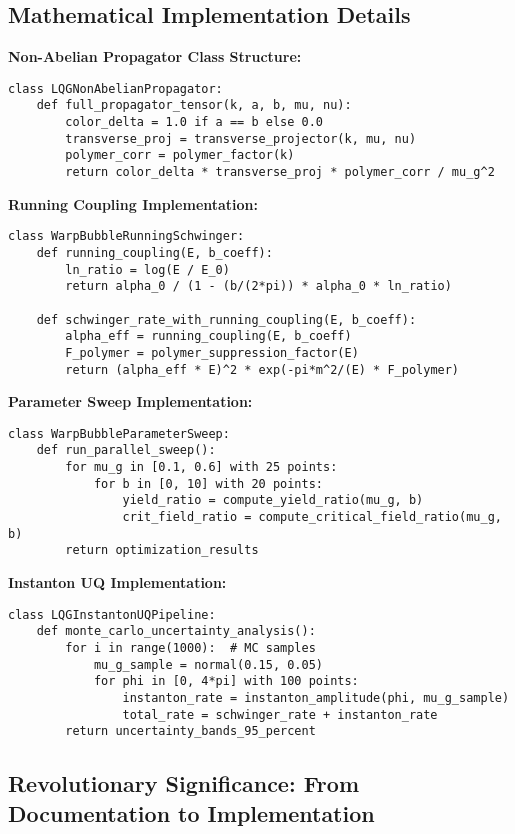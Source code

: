 \documentclass[11pt]{article}
\begin{document}
\subsection{Mathematical Implementation Details}

\textbf{Non-Abelian Propagator Class Structure:}
\begin{verbatim}
class LQGNonAbelianPropagator:
    def full_propagator_tensor(k, a, b, mu, nu):
        color_delta = 1.0 if a == b else 0.0
        transverse_proj = transverse_projector(k, mu, nu)
        polymer_corr = polymer_factor(k)
        return color_delta * transverse_proj * polymer_corr / mu_g^2
\end{verbatim}

\textbf{Running Coupling Implementation:}
\begin{verbatim}
class WarpBubbleRunningSchwinger:
    def running_coupling(E, b_coeff):
        ln_ratio = log(E / E_0)
        return alpha_0 / (1 - (b/(2*pi)) * alpha_0 * ln_ratio)
    
    def schwinger_rate_with_running_coupling(E, b_coeff):
        alpha_eff = running_coupling(E, b_coeff)
        F_polymer = polymer_suppression_factor(E)
        return (alpha_eff * E)^2 * exp(-pi*m^2/(E) * F_polymer)
\end{verbatim}

\textbf{Parameter Sweep Implementation:}
\begin{verbatim}
class WarpBubbleParameterSweep:
    def run_parallel_sweep():
        for mu_g in [0.1, 0.6] with 25 points:
            for b in [0, 10] with 20 points:
                yield_ratio = compute_yield_ratio(mu_g, b)
                crit_field_ratio = compute_critical_field_ratio(mu_g, b)
        return optimization_results
\end{verbatim}

\textbf{Instanton UQ Implementation:}
\begin{verbatim}
class LQGInstantonUQPipeline:
    def monte_carlo_uncertainty_analysis():
        for i in range(1000):  # MC samples
            mu_g_sample = normal(0.15, 0.05)
            for phi in [0, 4*pi] with 100 points:
                instanton_rate = instanton_amplitude(phi, mu_g_sample)
                total_rate = schwinger_rate + instanton_rate
        return uncertainty_bands_95_percent
\end{verbatim}

\subsection{Revolutionary Significance: From Documentation to Implementation}
\end{document}
